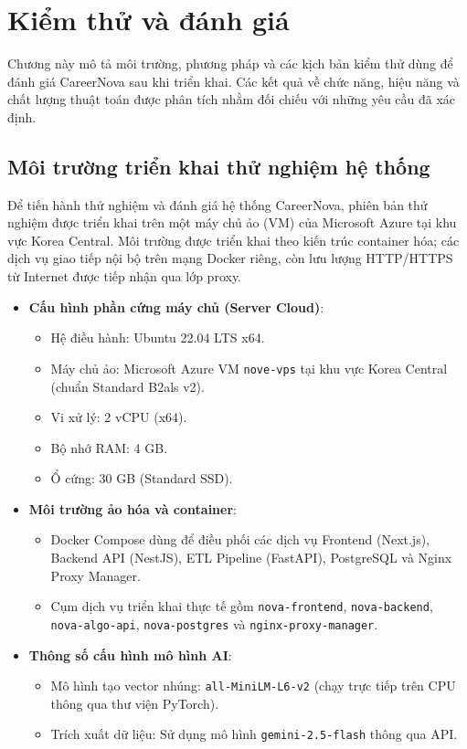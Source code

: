 \chapter{Kiểm thử và đánh giá}
\label{Chapter5}

Chương này mô tả môi trường, phương pháp và các kịch bản kiểm thử dùng để đánh giá CareerNova sau khi triển khai. Các kết quả về chức năng, hiệu năng và chất lượng thuật toán được phân tích nhằm đối chiếu với những yêu cầu đã xác định.

\section{Môi trường triển khai thử nghiệm hệ thống}

Để tiến hành thử nghiệm và đánh giá hệ thống CareerNova, phiên bản thử nghiệm được triển khai trên một máy chủ ảo (VM) của Microsoft Azure tại khu vực Korea Central. Môi trường được triển khai theo kiến trúc container hóa; các dịch vụ giao tiếp nội bộ trên mạng Docker riêng, còn lưu lượng HTTP/HTTPS từ Internet được tiếp nhận qua lớp proxy.

\begin{itemize}
    \item \textbf{Cấu hình phần cứng máy chủ (Server Cloud)}:
    \begin{itemize}
        \item Hệ điều hành: Ubuntu 22.04 LTS x64.
        \item Máy chủ ảo: Microsoft Azure VM \texttt{nove-vps} tại khu vực Korea Central (chuẩn Standard B2als v2).
        \item Vi xử lý: 2 vCPU (x64).
        \item Bộ nhớ RAM: 4 GB.
        \item Ổ cứng: 30 GB (Standard SSD).
    \end{itemize}
    \item \textbf{Môi trường ảo hóa và container}:
    \begin{itemize}
        \item Docker Compose dùng để điều phối các dịch vụ Frontend (Next.js), Backend API (NestJS), ETL Pipeline (FastAPI), PostgreSQL và Nginx Proxy Manager.
        \item Cụm dịch vụ triển khai thực tế gồm \texttt{nova-frontend}, \texttt{nova-backend}, \texttt{nova-algo-api}, \texttt{nova-postgres} và \texttt{nginx-proxy-manager}.
    \end{itemize}
    \item \textbf{Thông số cấu hình mô hình AI}:
    \begin{itemize}
        \item Mô hình tạo vector nhúng: \texttt{all-MiniLM-L6-v2} (chạy trực tiếp trên CPU thông qua thư viện PyTorch).
        \item Trích xuất dữ liệu: Sử dụng mô hình \texttt{gemini-2.5-flash} thông qua API.
    \end{itemize}
\end{itemize}

